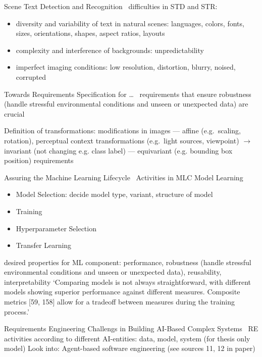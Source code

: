 Scene Text Detection and Recognition~\cite{long_scene_2021}
difficulties in STD and STR:
\begin{itemize}
    \item diversity and variability of text in natural scenes: languages, colors, fonts, sizes,
        orientations, shapes, aspect ratios, layouts
    \item complexity and interference of backgrounds: unpredictability
    \item imperfect imaging conditions: low resolution, distortion, blurry, noised, corrupted

\end{itemize}


Towards Requirements Specification for \ldots~\cite{hu_towards_2020}
requirements that ensure robustness (handle stressful environmental conditions and unseen or
unexpected data) are crucial

Definition of transformations: modifications in images
--- affine (e.g.\ scaling, rotation), perceptual context transformations (e.g.\ light sources, viewpoint)
$\rightarrow$ invariant (not changing e.g. class label) --- equivariant (e.g. bounding
                box position) requirements


Assuring the Machine Learning Lifecycle~\cite{ashmore_assuring_2021}
Activities in MLC Model Learning
\begin{itemize}
    \item Model Selection: decide model type, variant, structure of model
    \item Training
    \item Hyperparameter Selection
    \item Transfer Learning
\end{itemize}
desired properties for ML component: performance, robustness (handle stressful environmental
conditions and unseen or unexpected data), reusability, interpretability
`Comparing models is not always straightforward, with different models showing superior performance
against different measures. Composite metrics [59, 158] allow for a tradeoff between measures
during the training process.'

Requirements Engineering Challengs in Building AI-Based Complex Systems~\cite{belani_requirements_2019}
RE activities according to different AI-entities: data, model, system (for thesis only model)
Look into: Agent-based software engineering (see sources 11, 12 in paper)

